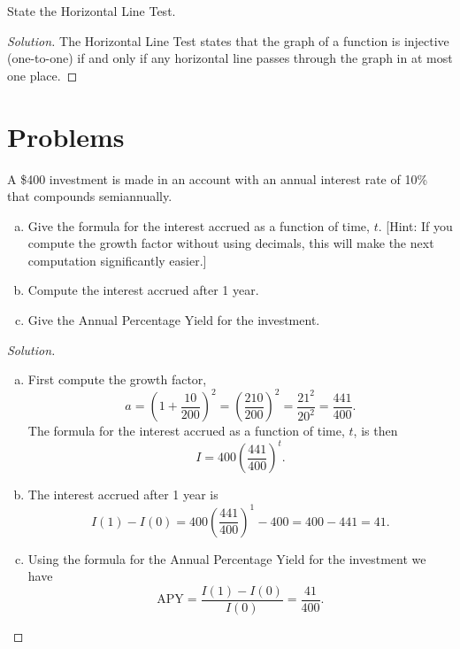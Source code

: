 \documentclass[12pt]{amsart}
\begin{document}
\begin{thm}[1 Point]
  State the Horizontal Line Test.
  
  \begin{proof}[Solution]
    The Horizontal Line Test states that the graph of a function is injective (one-to-one) if and only if any horizontal line passes through the graph in at most one place.
  \end{proof}
\end{thm}


\section{Problems}

\begin{thm}[16 Points]\label{ex5}
  A \$400 investment is made in an account with an annual interest rate of 10\% that compounds semiannually.
  \begin{enumerate}[(a)]
  \item
    Give the formula for the interest accrued as a function of time, $t$. 
    [Hint: If you compute the growth factor without using decimals, this will make the next computation significantly easier.]
  \item
    Compute the interest accrued after 1 year.
  \item
    Give the Annual Percentage Yield for the investment.
  \end{enumerate}
  
  \begin{proof}[Solution]
    \begin{enumerate}[(a)]
    \item
      First compute the growth factor,
      $$a = \left(1 + \frac{10}{200}\right)^2 = \left(\frac{210}{200}\right)^2 = \frac{21^2}{20^2} = \frac{441}{400}.$$
      The formula for the interest accrued as a function of time, $t$, is then
      $$I = 400 \left(\frac{441}{400}\right)^t.$$
    \item
      The interest accrued after 1 year is
      $$I(1) - I(0) = 400 \left(\frac{441}{400}\right)^1 - 400= 400 - 441 = 41.$$
    \item
      Using the formula for the Annual Percentage Yield for the investment we have
      $$\text{APY} = \frac{I(1) - I(0)}{I(0)} = \frac{41}{400}.$$
    \end{enumerate}
  \end{proof}
\end{thm}
\end{document}
